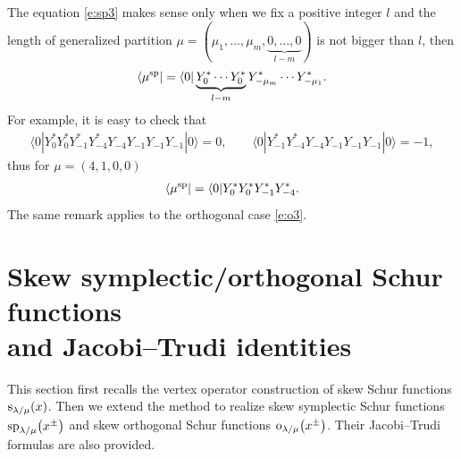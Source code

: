 \documentclass[10pt,a4paper]{amsart}
\numberwithin{equation}{section}
\begin{document}
\begin{Remark}
The equation \eqref{e:sp3} makes sense only when we fix a positive integer $l$ and the length of generalized partition $\mu=(\mu_1, \dots,\mu_m,\underbrace{0,\dots,0}_{l-m})$ is not bigger than $l$, then
\begin{align*}
\langle \mu^{\rm sp}|=\langle 0|\underbrace{Y^*_0\cdots Y^*_0}_{l-m}Y^*_{-\mu_m}\cdots Y^*_{-\mu_1}.
\end{align*}
For example, it is easy to check that
\begin{align*}
\langle 0|Y^*_0 Y^*_0Y^*_{-1}Y^*_{-4}Y_{-4}Y_{-1}Y_{-1}Y_{-1}|0\rangle=0,\qquad\langle 0|Y^*_{-1}Y^*_{-4}Y_{-4}Y_{-1}Y_{-1}Y_{-1}|0\rangle=-1,
\end{align*}
thus for $\mu=(4, 1, 0, 0)$
\begin{align*}
\langle \mu^{\rm sp}|=\langle 0|Y^*_0 Y^*_0Y^*_{-1}Y^*_{-4}.
\end{align*}
The same remark applies to the orthogonal case \eqref{e:o3}.
\end{Remark}

\section[Skew symplectic/orthogonal Schur functions and Jacobi--Trudi identities]{Skew symplectic/orthogonal Schur functions\\ and Jacobi--Trudi identities}\label{s3}

This section first recalls the vertex operator construction of skew Schur functions ${\rm s}_{\lambda/\mu}(x)$.
Then we extend the method to realize skew symplectic Schur functions ${\rm sp}_{\lambda/\mu}\big(x^{\pm}\big)$ and skew orthogonal Schur functions ${\rm o}_{\lambda/\mu}\big(x^{\pm}\big)$. Their
Jacobi--Trudi formulas are also provided.
\end{document}
